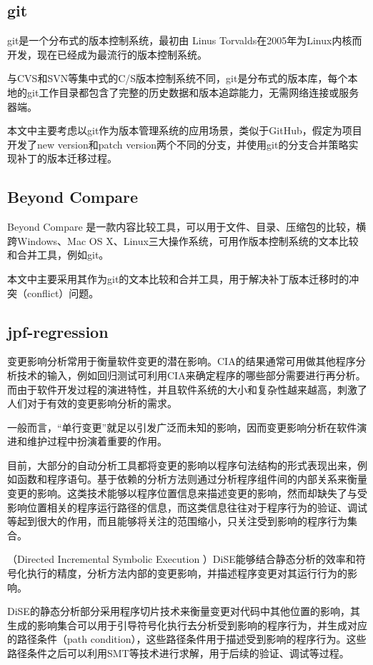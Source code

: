 	\subsection{git}		

git是一个分布式的版本控制系统，最初由 Linus Torvalds在2005年为Linux内核而开发，现在已经成为最流行的版本控制系统。

与CVS和SVN等集中式的C/S版本控制系统不同，git是分布式的版本库，每个本地的git工作目录都包含了完整的历史数据和版本追踪能力，无需网络连接或服务器端。
      

本文中主要考虑以git作为版本管理系统的应用场景，类似于GitHub，假定为项目开发了new version和patch version两个不同的分支，并使用git的分支合并策略实现补丁的版本迁移过程。
	\subsection{Beyond Compare}
		
Beyond Compare 是一款内容比较工具，可以用于文件、目录、压缩包的比较，横跨Windows、Mac OS X、Linux三大操作系统，可用作版本控制系统的文本比较和合并工具，例如git。
      
本文中主要采用其作为git的文本比较和合并工具，用于解决补丁版本迁移时的冲突（conflict）问题。


	\subsection{jpf-regression} 
变更影响分析常用于衡量软件变更的潜在影响。CIA的结果通常可用做其他程序分析技术的输入，例如回归测试可利用CIA来确定程序的哪些部分需要进行再分析。而由于软件开发过程的演进特性，并且软件系统的大小和复杂性越来越高，刺激了人们对于有效的变更影响分析的需求。

一般而言，“单行变更”就足以引发广泛而未知的影响，因而变更影响分析在软件演进和维护过程中扮演着重要的作用。

目前，大部分的自动分析工具都将变更的影响以程序句法结构的形式表现出来，例如函数和程序语句。基于依赖的分析方法则通过分析程序组件间的内部关系来衡量变更的影响。这类技术能够以程序位置信息来描述变更的影响，然而却缺失了与受影响位置相关的程序运行路径的信息，而这类信息往往对于程序行为的验证、调试等起到很大的作用，而且能够将关注的范围缩小，只关注受到影响的程序行为集合。

（Directed Incremental Symbolic Execution ）DiSE能够结合静态分析的效率和符号化执行的精度，分析方法内部的变更影响，并描述程序变更对其运行行为的影响。

DiSE的静态分析部分采用程序切片技术来衡量变更对代码中其他位置的影响，其生成的影响集合可以用于引导符号化执行去分析受到影响的程序行为，并生成对应的路径条件（path condition），这些路径条件用于描述受到影响的程序行为。这些路径条件之后可以利用SMT等技术进行求解，用于后续的验证、调试等过程。

